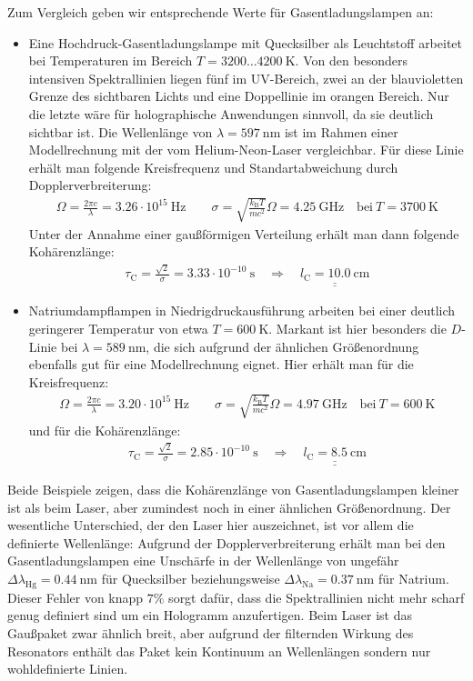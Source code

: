 \documentclass[german,  %
parskip=full,  %
]{scrartcl}
\begin{document}
Zum Vergleich geben wir entsprechende Werte für Gasentladungslampen an: 
\begin{itemize}
\item Eine Hochdruck-Gasentladungslampe mit Quecksilber als Leuchtstoff arbeitet bei Temperaturen im Bereich \(T = 3200 \hdots 4200 \ \mathrm{K}\). Von den besonders intensiven Spektrallinien liegen fünf im UV-Bereich, zwei an der blauvioletten Grenze des sichtbaren Lichts und eine Doppellinie im orangen Bereich. Nur die letzte wäre für holographische Anwendungen sinnvoll, da sie deutlich sichtbar ist. Die Wellenlänge von \(\lambda = 597 \ \mathrm{nm}\) ist im Rahmen einer Modellrechnung mit der vom Helium-Neon-Laser vergleichbar. Für diese Linie erhält man folgende Kreisfrequenz und Standartabweichung durch Dopplerverbreiterung:
\begin{align*}
\Omega = \frac{2\pi c}{\lambda} = 3.26\cdot 10^{15} \ \mathrm{Hz} \quad\quad \sigma = \sqrt{\frac{k_{\mathrm{B}} T}{mc^2}} \Omega = 4.25 \ \mathrm{GHz} \quad\text{bei} \ T = 3700 \ \mathrm{K}
\end{align*}
Unter der Annahme einer gaußförmigen Verteilung erhält man dann folgende Kohärenzlänge:
\begin{align*}
\tau_{\mathrm{C}} = \frac{\sqrt{2}}{\sigma} = 3.33\cdot 10^{-10} \ \mathrm{s} \quad\Longrightarrow\quad\underline{\underline{l_{\mathrm{C}} = 10.0 \ \mathrm{cm}}}
\end{align*}
\item Natriumdampflampen in Niedrigdruckausführung arbeiten bei einer deutlich geringerer Temperatur von etwa \(T = 600 \ \mathrm{K}\). Markant ist hier besonders die \(D\)-Linie bei \(\lambda = 589 \ \mathrm{nm}\), die sich aufgrund der ähnlichen Größenordnung ebenfalls gut für eine Modellrechnung eignet. Hier erhält man für die Kreisfrequenz:
\begin{align*}
\Omega = \frac{2\pi c}{\lambda} = 3.20\cdot 10^{15} \ \mathrm{Hz} \quad\quad \sigma = \sqrt{\frac{k_{\mathrm{B}} T}{mc^2}} \Omega = 4.97 \ \mathrm{GHz} \quad\text{bei} \ T = 600 \ \mathrm{K}
\end{align*}
und für die Kohärenzlänge:
\begin{align*}
\tau_{\mathrm{C}} = \frac{\sqrt{2}}{\sigma} = 2.85\cdot 10^{-10} \ \mathrm{s} \quad\Longrightarrow\quad\underline{\underline{l_{\mathrm{C}} = 8.5 \ \mathrm{cm}}}
\end{align*}
\end{itemize}
Beide Beispiele zeigen, dass die Kohärenzlänge von Gasentladungslampen kleiner ist als beim Laser, aber zumindest noch in einer ähnlichen Größenordnung. Der wesentliche Unterschied, der den Laser hier auszeichnet, ist vor allem die definierte Wellenlänge: Aufgrund der Dopplerverbreiterung erhält man bei den Gasentladungslampen eine Unschärfe in der Wellenlänge von ungefähr \(\Delta\lambda_{\mathrm{Hg}} = 0.44 \ \mathrm{nm}\) für Quecksilber beziehungsweise \(\Delta\lambda_{\mathrm{Na}} = 0.37 \ \mathrm{nm}\) für Natrium. Dieser Fehler von knapp \(7 \%\) sorgt dafür, dass die Spektrallinien nicht mehr scharf genug definiert sind um ein Hologramm anzufertigen. Beim Laser ist das Gaußpaket zwar ähnlich breit, aber aufgrund der filternden Wirkung des Resonators enthält das Paket kein Kontinuum an Wellenlängen sondern nur wohldefinierte Linien.
\end{document}

